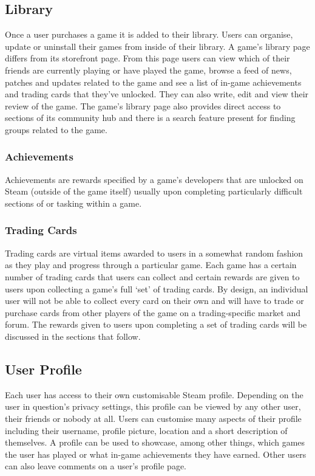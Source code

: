 \subsection{Library} \label{sec:BG_Steam_Lib}

Once a user purchases a game it is added to their library. Users can organise, update or uninstall their games from inside of their library. A game's library page differs from its storefront page. From this page users can view which of their friends are currently playing or have played the game, browse a feed of news, patches and updates related to the game and see a list of in-game achievements and trading cards that they've unlocked. They can also write, edit and view their review of the game. The game's library page also provides direct access to sections of its community hub and there is a search feature present for finding groups related to the game.

\subsubsection{Achievements}

Achievements are rewards specified by a game's developers that are unlocked on Steam (outside of the game itself) usually upon completing particularly difficult sections of or tasking within a game.

\subsubsection{Trading Cards}

Trading cards are virtual items awarded to users in a somewhat random fashion as they play and progress through a particular game. Each game has a certain number of trading cards that users can collect and certain rewards are given to users upon collecting a game's full `set' of trading cards. By design, an individual user will not be able to collect every card on their own and will have to trade or purchase cards from other players of the game on a trading-specific market and forum. The rewards given to users upon completing a set of trading cards will be discussed in the sections that follow.

\subsection{User Profile} \label{sec:BG_Steam_Profile}

Each user has access to their own customisable Steam profile. Depending on the user in question's privacy settings, this profile can be viewed by any other user, their friends or nobody at all. Users can customise many aspects of their profile including their username, profile picture, location and a short description of themselves. A profile can be used to showcase, among other things, which games the user has played or what in-game achievements they have earned. Other users can also leave comments on a user's profile page.

